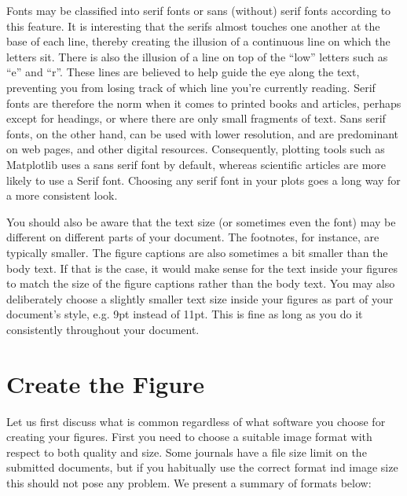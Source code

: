 \documentclass[12pt,a4paper]{article}
\begin{document}
\noindent Fonts may be classified into serif fonts or sans (without) serif fonts according to this feature.
It is interesting that the serifs almost touches one another at the base of each line, thereby creating the illusion of a continuous line on which the letters sit.
There is also the illusion of a line on top of the ``low'' letters such as ``e'' and ``r''.
These lines are believed to help guide the eye along the text, preventing you from losing track of which line you're currently reading.
Serif fonts are therefore the norm when it comes to printed books and articles, perhaps except for headings, or where there are only small fragments of text.
Sans serif fonts, on the other hand, can be used with lower resolution, and are predominant on web pages, and other digital resources. Consequently, plotting tools such as Matplotlib uses a sans serif font by default, whereas scientific articles are more likely to use a Serif font. Choosing any serif font in your plots goes a long way for a more consistent look.

You should also be aware that the text size (or sometimes even the font) may be different on different parts of your document. The footnotes, for instance, are typically smaller. The figure captions are also sometimes a bit smaller than the body text. If that is the case, it would make sense for the text inside your figures to match the size of the figure captions rather than the body text. You may also deliberately choose a slightly smaller text size inside your figures as part of your document's style, e.g. 9pt instead of 11pt. This is fine as long as you do it consistently throughout your document.

\section{Create the Figure}
Let us first discuss what is common regardless of what software you choose for creating your figures.
First you need to choose a suitable image format with respect to both quality and size. Some journals have a file size limit on the submitted documents, but if you habitually use the correct format ind image size this should not pose any problem. We present a summary of formats below:
\end{document}
